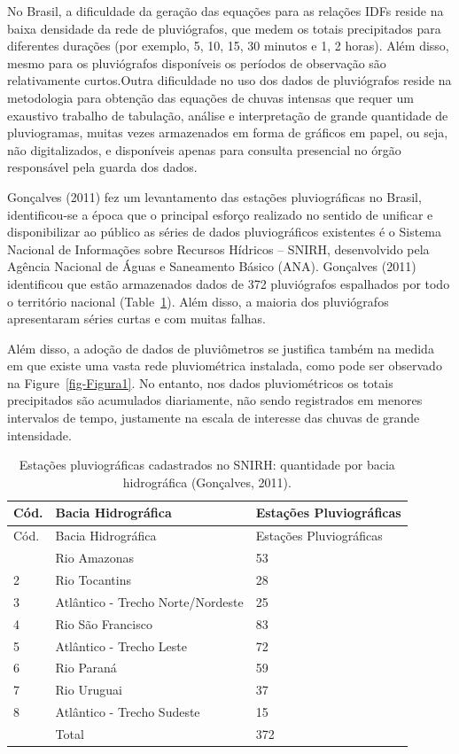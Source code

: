 \documentclass[
]{agujournal2019}
\begin{document}
No Brasil, a dificuldade da geração das equações para as relações IDFs
reside na baixa densidade da rede de pluviógrafos, que medem os totais
precipitados para diferentes durações (por exemplo, 5, 10, 15, 30
minutos e 1, 2 horas). Além disso, mesmo para os pluviógrafos
disponíveis os períodos de observação são relativamente curtos.Outra
dificuldade no uso dos dados de pluviógrafos reside na metodologia para
obtenção das equações de chuvas intensas que requer um exaustivo
trabalho de tabulação, análise e interpretação de grande quantidade de
pluviogramas, muitas vezes armazenados em forma de gráficos em papel, ou
seja, não digitalizados, e disponíveis apenas para consulta presencial
no órgão responsável pela guarda dos dados.

Gonçalves (2011) fez um levantamento das estações pluviográficas no
Brasil, identificou-se a época que o principal esforço realizado no
sentido de unificar e disponibilizar ao público as séries de dados
pluviográficos existentes é o Sistema Nacional de Informações sobre
Recursos Hídricos -- SNIRH, desenvolvido pela Agência Nacional de Águas
e Saneamento Básico (ANA). Gonçalves (2011) identificou que estão
armazenados dados de 372 pluviógrafos espalhados por todo o território
nacional (Table~\ref{tbl-Tab2}). Além disso, a maioria dos pluviógrafos
apresentaram séries curtas e com muitas falhas.

Além disso, a adoção de dados de pluviômetros se justifica também na
medida em que existe uma vasta rede pluviométrica instalada, como pode
ser observado na Figure~\ref{fig-Figura1}. No entanto, nos dados
pluviométricos os totais precipitados são acumulados diariamente, não
sendo registrados em menores intervalos de tempo, justamente na escala
de interesse das chuvas de grande intensidade.

\begin{longtable}[]{@{}lll@{}}
\caption{Estações pluviográficas cadastrados no SNIRH: quantidade por
bacia hidrográfica (Gonçalves, 2011).}\label{tbl-Tab2}\tabularnewline
\toprule\noalign{}
Cód. & Bacia Hidrográfica & Estações Pluviográficas \\
\midrule\noalign{}
\endfirsthead
\toprule\noalign{}
Cód. & Bacia Hidrográfica & Estações Pluviográficas \\
\midrule\noalign{}
\endhead
\bottomrule\noalign{}
\endlastfoot
1 & Rio Amazonas & 53 \\
2 & Rio Tocantins & 28 \\
3 & Atlântico - Trecho Norte/Nordeste & 25 \\
4 & Rio São Francisco & 83 \\
5 & Atlântico - Trecho Leste & 72 \\
6 & Rio Paraná & 59 \\
7 & Rio Uruguai & 37 \\
8 & Atlântico - Trecho Sudeste & 15 \\
& Total & 372 \\
\end{longtable}
\end{document}
